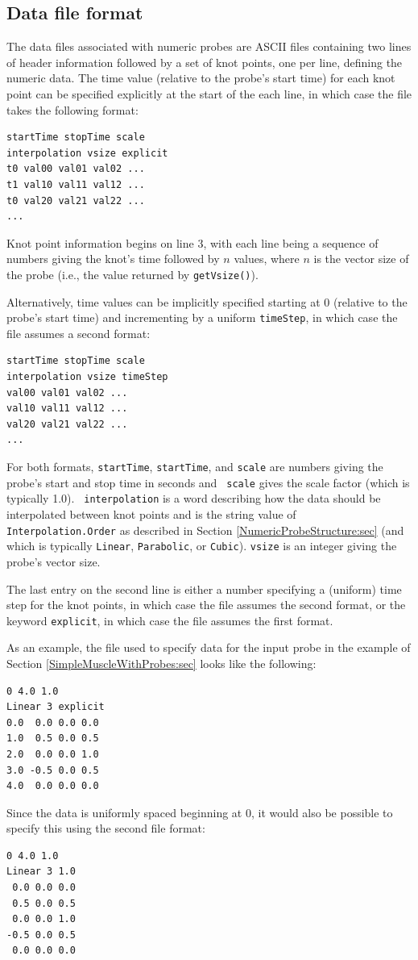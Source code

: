 \subsection{Data file format}
\label{DataFileFormat:sec}

The data files associated with numeric probes are ASCII files
containing two lines of header information followed by a set of knot
points, one per line, defining the numeric data. The time value
(relative to the probe's start time) for each knot point can be
specified explicitly at the start of the each line, in which case the
file takes the following format:
%
\begin{lstlisting}[]
startTime stopTime scale
interpolation vsize explicit
t0 val00 val01 val02 ...
t1 val10 val11 val12 ...
t0 val20 val21 val22 ...
...
\end{lstlisting}
%
Knot point information begins on line 3, with each line being a
sequence of numbers giving the knot's time followed by $n$ values,
where $n$ is the vector size of the probe (i.e., the value returned by
{\tt getVsize()}).

Alternatively, time values can be implicitly specified starting at 0
(relative to the probe's start time) and incrementing by a uniform
{\tt timeStep}, in which case the file assumes a second format:
%
\begin{lstlisting}[]
startTime stopTime scale
interpolation vsize timeStep
val00 val01 val02 ...
val10 val11 val12 ...
val20 val21 val22 ...
...
\end{lstlisting}
%
For both formats, {\tt startTime}, {\tt startTime}, and {\tt scale}
are numbers giving the probe's start and stop time in seconds and {\tt
scale} gives the scale factor (which is typically 1.0).  {\tt
interpolation} is a word describing how the data should be
interpolated between knot points and is the string value of {\tt
Interpolation.Order} as described in Section
\ref{NumericProbeStructure:sec} (and which is typically {\tt Linear},
{\tt Parabolic}, or {\tt Cubic}). {\tt vsize} is an integer giving the
probe's vector size.

The last entry on the second line is either a number specifying a
(uniform) time step for the knot points, in which case the file
assumes the second format, or the keyword {\tt explicit}, in which
case the file assumes the first format.

As an example, the file used to specify data for the input probe in
the example of Section \ref{SimpleMuscleWithProbes:sec} looks like
the following:
%
\begin{lstlisting}[]
0 4.0 1.0
Linear 3 explicit
0.0  0.0 0.0 0.0 
1.0  0.5 0.0 0.5
2.0  0.0 0.0 1.0
3.0 -0.5 0.0 0.5
4.0  0.0 0.0 0.0
\end{lstlisting}
%
Since the data is uniformly spaced beginning at 0, it would also be
possible to specify this using the second file format:
%
\begin{lstlisting}[]
0 4.0 1.0
Linear 3 1.0
 0.0 0.0 0.0 
 0.5 0.0 0.5
 0.0 0.0 1.0
-0.5 0.0 0.5
 0.0 0.0 0.0
\end{lstlisting}
%

